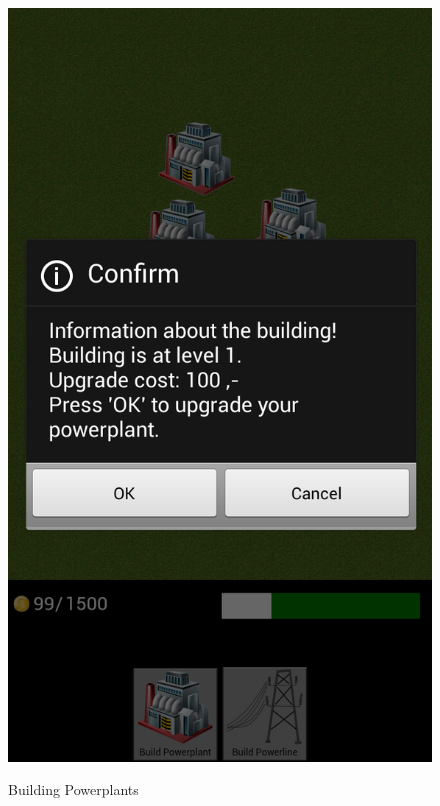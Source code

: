 \begin{figure}[H]
{		\includegraphics[scale=0.17]{pictures/sprint2-screen/sprint2-12}
	}
	\caption{Building Powerplants}
	\end{figure}

